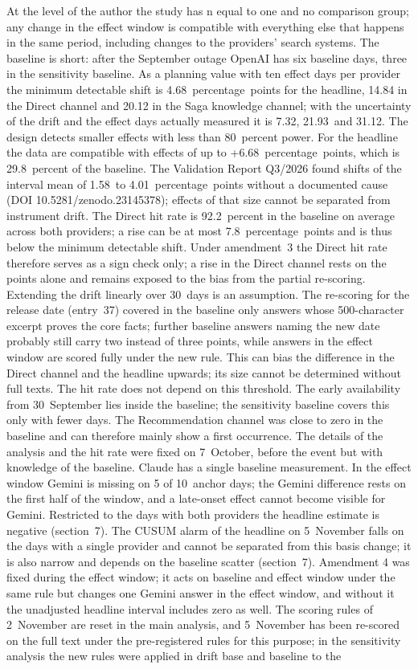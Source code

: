 \documentclass[11pt]{article}
\begin{document}
At the level of the author the study has n equal to one and no comparison group; any change in the effect window is compatible with everything else that happens in the same period, including changes to the providers' search systems. The baseline is short: after the September outage OpenAI has six baseline days, three in the sensitivity baseline. As a planning value with ten effect days per provider the minimum detectable shift is 4.68~percentage~points for the headline, 14.84 in the Direct channel and 20.12 in the Saga knowledge channel; with the uncertainty of the drift and the effect days actually measured it is 7.32, 21.93~and 31.12. The design detects smaller effects with less than 80~percent power. For the headline the data are compatible with effects of up to +6.68~percentage~points, which is 29.8~percent of the baseline. The Validation Report Q3/2026 found shifts of the interval mean of 1.58~to 4.01~percentage~points without a documented cause (DOI 10.5281/zenodo.23145378); effects of that size cannot be separated from instrument drift. The Direct hit rate is 92.2~percent in the baseline on average across both providers; a rise can be at most 7.8~percentage~points and is thus below the minimum detectable shift. Under amendment~3 the Direct hit rate therefore serves as a sign check only; a rise in the Direct channel rests on the points alone and remains exposed to the bias from the partial re-scoring. Extending the drift linearly over 30~days is an assumption. The re-scoring for the release date (entry~37) covered in the baseline only answers whose 500-character excerpt proves the core facts; further baseline answers naming the new date probably still carry two instead of three points, while answers in the effect window are scored fully under the new rule. This can bias the difference in the Direct channel and the headline upwards; its size cannot be determined without full texts. The hit rate does not depend on this threshold. The early availability from 30~September lies inside the baseline; the sensitivity baseline covers this only with fewer days. The Recommendation channel was close to zero in the baseline and can therefore mainly show a first occurrence. The details of the analysis and the hit rate were fixed on 7~October, before the event but with knowledge of the baseline. Claude has a single baseline measurement. In the effect window Gemini is missing on 5 of 10~anchor days; the Gemini difference rests on the first half of the window, and a late-onset effect cannot become visible for Gemini. Restricted to the days with both providers the headline estimate is negative (section~7). The CUSUM alarm of the headline on 5~November falls on the days with a single provider and cannot be separated from this basis change; it is also narrow and depends on the baseline scatter (section~7). Amendment 4 was fixed during the effect window; it acts on baseline and effect window under the same rule but changes one Gemini answer in the effect window, and without it the unadjusted headline interval includes zero as well. The scoring rules of 2~November are reset in the main analysis, and 5~November has been re-scored on the full text under the pre-registered rules for this purpose; in the sensitivity analysis the new rules were applied in drift base and baseline to the 
\end{document}
